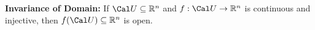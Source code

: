 \def\ccy{\Cyan}		  %
\def\cpb{\ProcessBlue}	  %
\def\csb{\SkyBlue}	  %
\def\ctu{\Turquoise}	  %
\def\ctb{\TealBlue}	  %
\def\caq{\Aquamarine}	  %
\def\cbg{\BlueGreen}	  %
\def\cem{\Emerald}	  %
\def\csg{\SeaGreen}	  %
\def\cgg{\Green}	  %
\def\cfg{\ForestGreen}	  %
\def\cpg{\PineGreen}	  %
\def\clg{\LimeGreen}	  %
\def\cyg{\YellowGreen}	  %
\def\cspg{\SpringGreen}	  %
\def\cog{\OliveGreen}	  %
\def\pars{\RawSienna}	  %
\def\cse{\Sepia}		  %
\def\cbr{\Brown}		  %
\def\cta{\Tan}		  %
\def\cgr{\Gray}		  %
\def\cbl{\Black}		  %
\def\cwh{\White}		  %


\loadmsbm



\def\ctln{\centerline}
\def\u{\underbar}
\def\ssk{\smallskip}
\def\msk{\medskip}
\def\bsk{\bigskip}
\def\hsk{\hskip.1in}
\def\hhsk{\hskip.2in}
\def\dsl{\displaystyle}
\def\hskp{\hskip1.5in}

\def\lra{$\Leftrightarrow$ }
\def\ra{\rightarrow}
\def\mpto{\logmapsto}
\def\pu{\pi_1}
\def\mpu{$\pi_1$}
\def\sig{\Sigma}
\def\msig{$\Sigma$}
\def\ep{\epsilon}
\def\sset{\subseteq}
\def\del{\partial}
\def\inv{^{-1}}
\def\wtl{\widetilde}
\def\del{\partial}
\def\delp{\partial^\prime}
\def\delpp{\partial^{\prime\prime}}
\def\sgn{{\roman{sgn}}}
\def\wtih{\widetilde{H}}
\def\bbz{{\Bbb Z}}
\def\bbr{{\Bbb R}}
\def\hdsk{\hskip.7in}
\def\hdskb{\hskip.9in}
\def\hdskc{\hskip1.1in}
\def\hdskd{\hskip1.3in}



{\bf Invariance of Domain:} If ${\Cal U}\subseteq {\Bbb R}^n$ and $f:{\Cal U}\ra {\Bbb R}^n$
is continuous and injective, then $f({\Cal U})\subseteq {\Bbb R}^n$ is open.

